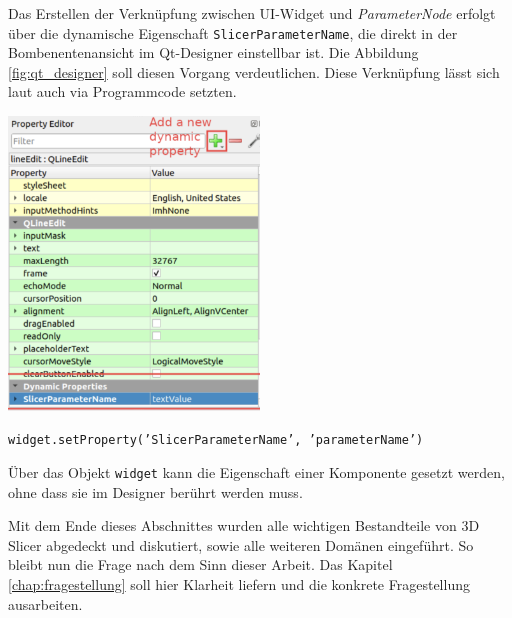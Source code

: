 \begin{minipage}{0.35\textwidth}
	Das Erstellen der Verknüpfung zwischen \ac{UI}-Widget und \textit{ParameterNode}
	erfolgt über die dynamische Eigenschaft \texttt{SlicerParameterName}, die direkt
	in der Bombenentenansicht im Qt-Designer einstellbar ist. Die Abbildung
	\ref{fig:qt_designer} soll diesen Vorgang verdeutlichen. Diese Verknüpfung lässt
	sich laut \citet{slicer2024} auch via Programmcode setzten.
\end{minipage}
\hfill
\begin{minipage}{0.55\textwidth}
	\centering
	\includegraphics[width=0.5\textwidth]{img/qt_designer.jpg}
	\label{fig:qt_designer}
\end{minipage}

\begin{center}
	\texttt{widget.setProperty('SlicerParameterName', 'parameterName')}
\end{center}

Über das Objekt \texttt{widget} kann die Eigenschaft einer Komponente gesetzt
werden, ohne dass sie im Designer berührt werden muss.

Mit dem Ende dieses Abschnittes wurden alle wichtigen Bestandteile von 3D Slicer
abgedeckt und diskutiert, sowie alle weiteren Domänen eingeführt. So bleibt nun die
Frage nach dem Sinn dieser Arbeit. Das Kapitel \ref{chap:fragestellung} soll
hier Klarheit liefern und die konkrete Fragestellung ausarbeiten.
